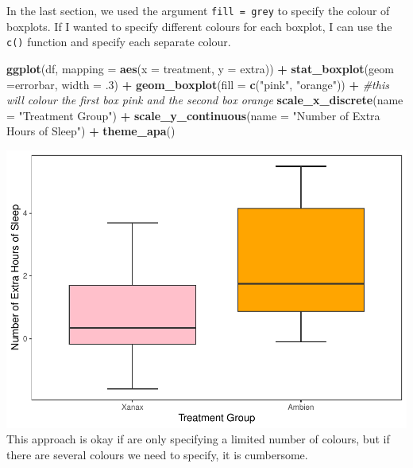 \documentclass[
]{book}
\newenvironment{Shaded}{\begin{snugshade}}{\end{snugshade}}
\newcommand{\AttributeTok}[1]{\textcolor[rgb]{0.13,0.29,0.53}{#1}}
\newcommand{\CommentTok}[1]{\textcolor[rgb]{0.56,0.35,0.01}{\textit{#1}}}
\newcommand{\DecValTok}[1]{\textcolor[rgb]{0.00,0.00,0.81}{#1}}
\newcommand{\FunctionTok}[1]{\textcolor[rgb]{0.13,0.29,0.53}{\textbf{#1}}}
\newcommand{\NormalTok}[1]{#1}
\newcommand{\SpecialCharTok}[1]{\textcolor[rgb]{0.81,0.36,0.00}{\textbf{#1}}}
\newcommand{\StringTok}[1]{\textcolor[rgb]{0.31,0.60,0.02}{#1}}
\begin{document}
In the last section, we used the argument \texttt{fill\ =\ grey} to specify the colour of boxplots. If I wanted to specify different colours for each boxplot, I can use the \texttt{c()} function and specify each separate colour.

\begin{Shaded}
\begin{Highlighting}[]
\FunctionTok{ggplot}\NormalTok{(df, }\AttributeTok{mapping =} \FunctionTok{aes}\NormalTok{(}\AttributeTok{x =}\NormalTok{ treatment, }\AttributeTok{y =}\NormalTok{ extra)) }\SpecialCharTok{+} 
  \FunctionTok{stat\_boxplot}\NormalTok{(}\AttributeTok{geom =}\StringTok{\textquotesingle{}errorbar\textquotesingle{}}\NormalTok{, }\AttributeTok{width =}\NormalTok{ .}\DecValTok{3}\NormalTok{) }\SpecialCharTok{+}
  \FunctionTok{geom\_boxplot}\NormalTok{(}\AttributeTok{fill =} \FunctionTok{c}\NormalTok{(}\StringTok{"pink"}\NormalTok{, }\StringTok{"orange"}\NormalTok{)) }\SpecialCharTok{+} \CommentTok{\#this will colour the first box pink and the second box orange}
  \FunctionTok{scale\_x\_discrete}\NormalTok{(}\AttributeTok{name =} \StringTok{"Treatment Group"}\NormalTok{) }\SpecialCharTok{+} 
  \FunctionTok{scale\_y\_continuous}\NormalTok{(}\AttributeTok{name =} \StringTok{"Number of Extra Hours of Sleep"}\NormalTok{) }\SpecialCharTok{+}
  \FunctionTok{theme\_apa}\NormalTok{()}
\end{Highlighting}
\end{Shaded}

\includegraphics{rintro_demo_files/figure-latex/unnamed-chunk-294-1.pdf}
This approach is okay if are only specifying a limited number of colours, but if there are several colours we need to specify, it is cumbersome.
\end{document}
